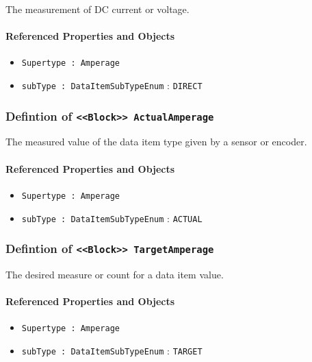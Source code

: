 \FloatBarrier

The measurement of DC current or voltage.

\FloatBarrier
\paragraph{Referenced Properties and Objects}

\begin{itemize}
\item \texttt{Supertype : Amperage}

\item \texttt{subType : DataItemSubTypeEnum} : \texttt{DIRECT}

\end{itemize}
\FloatBarrier
\subsubsection{Defintion of \texttt{<<Block>> ActualAmperage}}
  \label{type:ActualAmperage}

\FloatBarrier

The measured value of the data item type given by a sensor or encoder.

\FloatBarrier
\paragraph{Referenced Properties and Objects}

\begin{itemize}
\item \texttt{Supertype : Amperage}

\item \texttt{subType : DataItemSubTypeEnum} : \texttt{ACTUAL}

\end{itemize}
\FloatBarrier
\subsubsection{Defintion of \texttt{<<Block>> TargetAmperage}}
  \label{type:TargetAmperage}

\FloatBarrier

The desired measure or count for a data item value.

\FloatBarrier
\paragraph{Referenced Properties and Objects}

\begin{itemize}
\item \texttt{Supertype : Amperage}

\item \texttt{subType : DataItemSubTypeEnum} : \texttt{TARGET}

\end{itemize}
\FloatBarrier
